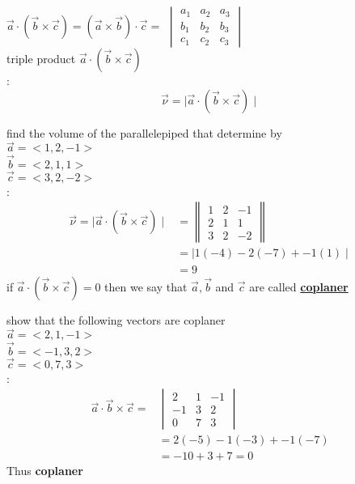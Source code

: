 \noindent{\color{smalt(darkpowderblue)}\rule{\linewidth}{.2mm}}
$\overrightarrow{a} \cdot (\overrightarrow{b} \times \overrightarrow{c}) = (\overrightarrow{a} \times \overrightarrow{b}) \cdot \overrightarrow{c} =$ $\begin{vmatrix}
a_{1} & a_{2} & a_{3} \\
  b_{1} & b_{2} & b_{3} \\
  c_{1} & c_{2} & c_{3} 
 \end{vmatrix}$\\
 triple product $\overrightarrow{a} \cdot (\overrightarrow{b} \times \overrightarrow{c})$\\
{\color{smalt(darkpowderblue)}{ volume of the parallelepiped }}:
$$\overrightarrow{\nu}= \mid \overrightarrow{a} \cdot (\overrightarrow{b} \times \overrightarrow{c}) \mid$$
\noindent{\color{smalt(darkpowderblue)}\rule{\linewidth}{.2mm}}
 \begin{example}
  find the volume of the parallelepiped that determine by \\
 $\overrightarrow{a} = <1,2,-1>$\\
 $\overrightarrow{b} = <2,1,1>$\\
 $\overrightarrow{c} = <3,2,-2>$\\
 {} :
 \begin{align*}
      \overrightarrow{\nu}=\mid \overrightarrow{a} \cdot (\overrightarrow{b} \times \overrightarrow{c}) \mid 
      & = 
\begin{Vmatrix}
 1 & 2 & -1 \\
 2 & 1 & 1 \\
 3 & 2 & -2 
 \end{Vmatrix} \\
 & =\mid 1(-4) -2(-7) + -1(1) \mid \\
 &= 9 
 \end{align*}
if $\overrightarrow{a}\cdot(\overrightarrow{b}\times \overrightarrow{c}) = 0$ then we say that $\overrightarrow{a} , \overrightarrow{b}$ and $\overrightarrow{c}$ are called 
\textbf{\underline{coplaner}}
\end{example}
\noindent{\color{smalt(darkpowderblue)}\rule{\linewidth}{.2mm}}
\begin{example}
 show that the following vectors are coplaner \\
$\overrightarrow{a} = < 2,1,-1 >$\\
$\overrightarrow{b} = < -1,3,2 >$\\
$\overrightarrow{c} = < 0,7,3 >$\\
 {} : 
 \begin{align*}
  \overrightarrow{a} \cdot \overrightarrow{b} \times \overrightarrow{c} = &
 \begin{vmatrix}
 2 & 1 & -1 \\
 -1 & 3 & 2 \\
 0 & 7 & 3 
 \end{vmatrix} \\
 & =2(-5) -1(-3) + -1(-7) \\
 & = -10 +3 +7 = 0 
 \end{align*}
Thus \textbf{coplaner}
\end{example}
